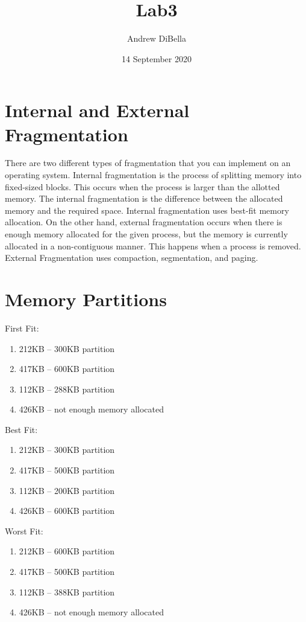 \documentclass{article}
\title{Lab3}
\author{Andrew DiBella }
\date{14 September 2020}
\begin{document}
\maketitle

\section{Internal and External Fragmentation}
There are two different types of fragmentation that you can implement on an operating system. Internal fragmentation is the process of splitting memory into fixed-sized blocks. This occurs when the process is larger than the allotted memory. The internal fragmentation is the difference between the allocated memory and the required space. Internal fragmentation uses best-fit memory allocation. On the other hand, external fragmentation occurs when there is enough memory allocated for the given process, but the memory is currently allocated in a non-contiguous manner. This happens when a process is removed. External Fragmentation uses compaction, segmentation, and paging.   
\section{Memory Partitions}
First Fit: 
\begin{enumerate}
  \item 212KB -- 300KB partition
  \item 417KB -- 600KB partition
  \item 112KB -- 288KB partition
  \item 426KB -- not enough memory allocated
\end{enumerate}
Best Fit: 
\begin{enumerate}
  \item 212KB -- 300KB partition
  \item 417KB -- 500KB partition
  \item 112KB -- 200KB partition
  \item 426KB -- 600KB partition 
\end{enumerate}
Worst Fit: 
\begin{enumerate}
  \item 212KB -- 600KB partition
  \item 417KB -- 500KB partition
  \item 112KB -- 388KB partition
  \item 426KB -- not enough memory allocated
\end{enumerate}
\end{document}
